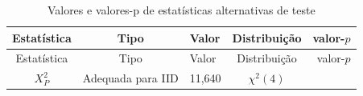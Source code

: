 \documentclass[]{book}
\theoremstyle{definition}
\theoremstyle{definition}
\theoremstyle{definition}
\theoremstyle{remark}
\begin{document}
\begin{longtable}[]{@{}cclcr@{}}
\caption{\label{tab:estaltteste}Valores e valores-p de estatísticas
alternativas de teste}\tabularnewline
\toprule
\begin{minipage}[b]{0.40\columnwidth}\centering\strut
Estatística\strut
\end{minipage} & \begin{minipage}[b]{0.15\columnwidth}\centering\strut
Tipo\strut
\end{minipage} & \begin{minipage}[b]{0.05\columnwidth}\raggedright\strut
Valor\strut
\end{minipage} & \begin{minipage}[b]{0.19\columnwidth}\centering\strut
Distribuição\strut
\end{minipage} & \begin{minipage}[b]{0.07\columnwidth}\raggedleft\strut
valor-\(p\)\strut
\end{minipage}\tabularnewline
\midrule
\endfirsthead
\toprule
\begin{minipage}[b]{0.40\columnwidth}\centering\strut
Estatística\strut
\end{minipage} & \begin{minipage}[b]{0.15\columnwidth}\centering\strut
Tipo\strut
\end{minipage} & \begin{minipage}[b]{0.05\columnwidth}\raggedright\strut
Valor\strut
\end{minipage} & \begin{minipage}[b]{0.19\columnwidth}\centering\strut
Distribuição\strut
\end{minipage} & \begin{minipage}[b]{0.07\columnwidth}\raggedleft\strut
valor-\(p\)\strut
\end{minipage}\tabularnewline
\midrule
\endhead
\begin{minipage}[t]{0.40\columnwidth}\centering\strut
\(X_{P}^{2}\)\strut
\end{minipage} & \begin{minipage}[t]{0.15\columnwidth}\centering\strut
Adequada para IID\strut
\end{minipage} & \begin{minipage}[t]{0.05\columnwidth}\raggedright\strut
11,640\strut
\end{minipage} & \begin{minipage}[t]{0.19\columnwidth}\centering\strut
\(\chi ^{2}(4)\)\strut
\end{minipage} & \begin{minipage}[t]{0.07\columnwidth}\raggedleft\strut

\end{minipage}
\end{longtable}
\end{document}
